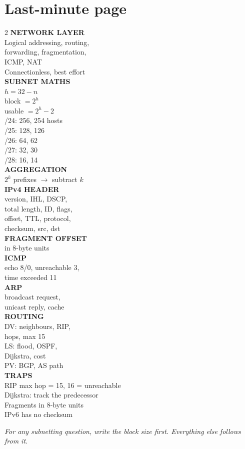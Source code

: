 \documentclass[11pt,a4paper]{article}
\begin{document}
\section{Last-minute page}

\begin{multicols}{2}
\textbf{NETWORK LAYER}\\
Logical addressing, routing,\\
forwarding, fragmentation,\\
ICMP, NAT\\
Connectionless, best effort\\[5pt]
\textbf{SUBNET MATHS}\\
$h = 32 - n$\\
block $= 2^h$\\
usable $= 2^h - 2$\\
/24: 256, 254 hosts\\
/25: 128, 126\\
/26: 64, 62\\
/27: 32, 30\\
/28: 16, 14\\[5pt]
\textbf{AGGREGATION}\\
$2^k$ prefixes $\to$ subtract $k$\\[5pt]
\textbf{IPv4 HEADER}\\
version, IHL, DSCP,\\
total length, ID, flags,\\
offset, TTL, protocol,\\
checksum, src, dst\\[5pt]
\textbf{FRAGMENT OFFSET}\\
in 8-byte units\\[5pt]
\textbf{ICMP}\\
echo 8/0, unreachable 3,\\
time exceeded 11\\[5pt]
\textbf{ARP}\\
broadcast request,\\
unicast reply, cache\\[5pt]
\textbf{ROUTING}\\
DV: neighbours, RIP,\\
hops, max 15\\
LS: flood, OSPF,\\
Dijkstra, cost\\
PV: BGP, AS path\\[5pt]
\textbf{TRAPS}\\
RIP max hop = 15, 16 = unreachable\\
Dijkstra: track the predecessor\\
Fragments in 8-byte units\\
IPv6 has no checksum
\end{multicols}

\vfill
\begin{center}\textit{For any subnetting question, write the block size first. Everything else follows from it.}\end{center}
\end{document}
